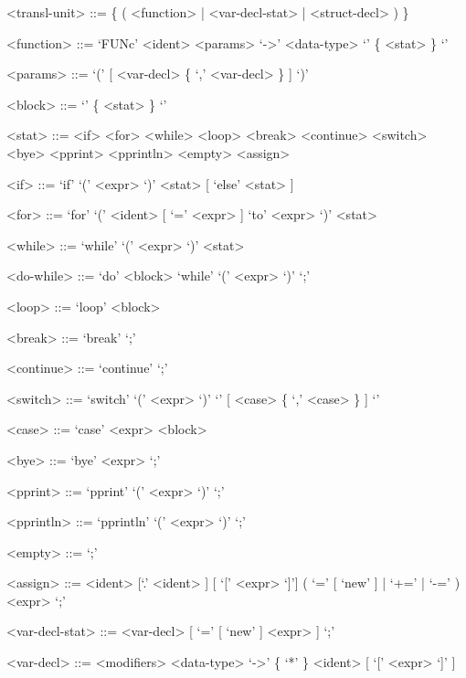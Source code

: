 \documentclass[12pt, a4paper]{article}
\begin{document}
    \setlength{\grammarparsep}{0.6em} %
    \setlength{\grammarindent}{10em} %

    \begin{grammar}

        <transl-unit> ::= \{ ( <function> | <var-decl-stat> | <struct-decl> ) \}

        <function> ::= `FUNc' <ident> <params> `->' <data-type> `{'  \{ <stat> \} `}'

        <params> ::= `(' [ <var-decl> \{ `,' <var-decl> \} ] `)'

        <block> ::= `{'  \{ <stat> \} `}'

        <stat> ::= <if>
        \alt <for>
        \alt <while>
        \alt <loop>
        \alt <break>
        \alt <continue>
        \alt <switch>
        \alt <bye>
        \alt <pprint>
        \alt <pprintln>
        \alt <empty>
        \alt <assign>

        <if> ::= `if' `(' <expr> `)' <stat> [ `else' <stat> ]

        <for> ::= `for' `(' <ident> [ `=' <expr> ] `to' <expr> `)' <stat>

        <while> ::= `while' `(' <expr> `)' <stat>

        <do-while> ::= `do' <block> `while' `(' <expr> `)' `;'

        <loop> ::= `loop' <block>

        <break> ::= `break' `;'

        <continue> ::= `continue' `;'

        <switch> ::= `switch' `(' <expr> `)' `{' [ <case> \{ `,' <case> \} ] `}'

        <case> ::= `case' <expr> <block>

        <bye> ::= `bye' <expr> `;'

        <pprint> ::= `pprint' `(' <expr> `)' `;'

        <pprintln> ::= `pprintln' `(' <expr> `)' `;'

        <empty> ::= `;'

        <assign> ::= <ident> [`.' <ident> ] [ `[' <expr> `]'] ( `=' [ `new' ] | `+=' | `-=' ) <expr> `;'

        <var-decl-stat> ::= <var-decl> [ `=' [ `new' ] <expr> ] `;'

        <var-decl> ::= <modifiers> <data-type> `->' \{ `*' \} <ident> [ `[' <expr> `]' ]


\end{grammar}
\end{document}
